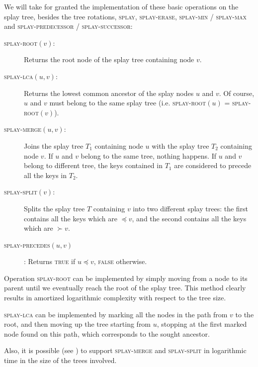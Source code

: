 \documentclass[a4paper,USenglish]{lipics}
\begin{document}
		We will take for granted the implementation of these basic operations on the splay tree, besides the  tree rotations, \textsc{splay}, \textsc{splay-erase}, \textsc{splay-min} / \textsc{splay-max} and \textsc{splay-predecessor} / \textsc{splay-successor}:
		\begin{description}
			\item[\textsc{splay-root}$(v)$:] Returns the root node of the splay tree containing node $v$.
			
			\item[\textsc{splay-lca}$(u,v)$:] Returns the lowest common ancestor of the splay nodes $u$ and $v$. Of course, $u$ and $v$ must belong to the same splay tree (i.e. \textsc{splay-root}$(u)$ = \textsc{splay-root}$(v)$).
			
			\item[\textsc{splay-merge}$(u, v)$:] Joins the splay tree $T_1$ containing node $u$ with the splay tree $T_2$ containing node $v$. If $u$ and $v$ belong to the same tree, nothing happens. If $u$ and $v$ belong to different tree, the keys contained in $T_1$ are considered to precede all the keys in $T_2$.
			
			\item[\textsc{splay-split}$(v)$:] Splits the splay tree $T$ containing $v$ into two different splay trees: the first contains all the keys which are $\preceq v$, and the second contains all the keys which are $\succ v$.
			
			\item[\textsc{splay-precedes}$(u,v)$]: Returns \textsc{true} if $u \preceq v$, \textsc{false} otherwise.
		\end{description}
		Operation \textsc{splay-root} can be implemented by simply moving from a node to its parent until we eventually reach the root of the splay tree. This method clearly results in amortized logarithmic complexity with respect to the tree size.
		
		\textsc{splay-lca} can be implemented by marking all the nodes in the path from $v$ to the root, and then moving up the tree starting from $u$, stopping at the first marked node found on this path, which corresponds to the sought ancestor.
		
Also, it is possible   (see \cite{GKSTW11})  to support \textsc{splay-merge} and \textsc{splay-split} in logarithmic time in the size of the trees involved.
		
\end{document}
